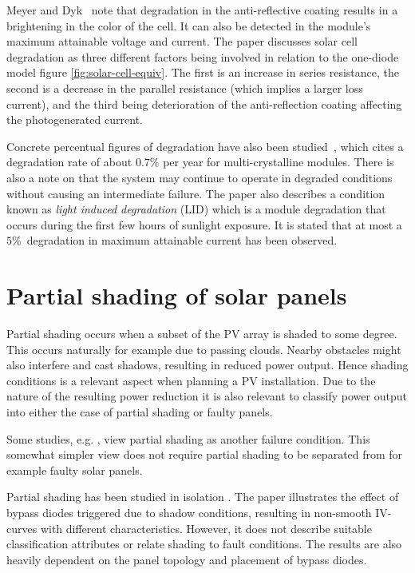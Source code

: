 Meyer and Dyk~\cite{Meyer2004} note that degradation in the anti-reflective coating results in a brightening in the color of the cell.
It can also be detected in the module's maximum attainable voltage and current.
The paper discusses solar cell degradation as three different factors being involved in relation to the one-diode model figure \ref{fig:solar-cell-equiv}.
The first is an increase in series resistance, the second is a decrease in the parallel resistance (which implies a larger loss current), and the third being deterioration of the anti-reflection coating affecting the photogenerated current.

Concrete percentual figures of degradation have also been studied~\cite{Quintana2002}, which cites a degradation rate of about $0.7\%$ per year for multi-crystalline modules.
There is also a note on that the system may continue to operate in degraded conditions without causing an intermediate failure.
The paper also describes a condition known as \emph{light induced degradation} (LID) which is a module degradation
that occurs during the first few hours of sunlight exposure.
It is stated that at most a $5\%$ degradation in maximum attainable current has been observed.

\section{Partial shading of solar panels}
Partial shading occurs when a subset of the PV array is shaded to some degree.
This occurs naturally for example due to passing clouds.
Nearby obstacles might also interfere and cast shadows, resulting in reduced power output.
Hence shading conditions is a relevant aspect when planning a PV installation.
Due to the nature of the resulting power reduction it is also relevant to classify power output into either the case of partial shading or faulty panels.

Some studies, e.g. \cite{Stettler2005}, view partial shading as another failure condition.
This somewhat simpler view does not require partial shading to be separated from for example faulty solar panels.

Partial shading has been studied in isolation \cite{Alsayid2013}.
The paper illustrates the effect of bypass diodes triggered due to shadow conditions, resulting in non-smooth IV-curves with different characteristics.
However, it does not describe suitable classification attributes or relate shading to fault conditions.
The results are also heavily dependent on the panel topology and placement of bypass diodes.

